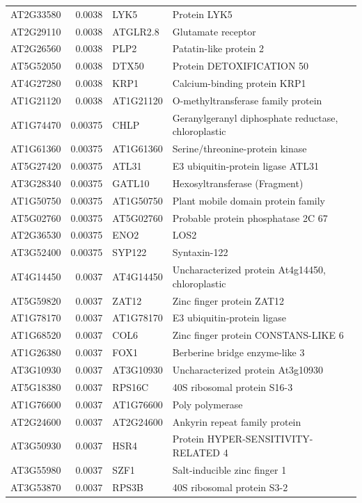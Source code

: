\documentclass[11pt]{article}
\begin{document}
\begin{center}
\begin{tabular}{lrll}
AT2G33580 & 0.0038 & LYK5 & Protein LYK5\\
AT2G29110 & 0.0038 & ATGLR2.8 & Glutamate receptor\\
AT2G26560 & 0.0038 & PLP2 & Patatin-like protein 2\\
AT5G52050 & 0.0038 & DTX50 & Protein DETOXIFICATION 50\\
AT4G27280 & 0.0038 & KRP1 & Calcium-binding protein KRP1\\
AT1G21120 & 0.0038 & AT1G21120 & O-methyltransferase family protein\\
AT1G74470 & 0.00375 & CHLP & Geranylgeranyl diphosphate reductase, chloroplastic\\
AT1G61360 & 0.00375 & AT1G61360 & Serine/threonine-protein kinase\\
AT5G27420 & 0.00375 & ATL31 & E3 ubiquitin-protein ligase ATL31\\
AT3G28340 & 0.00375 & GATL10 & Hexosyltransferase (Fragment)\\
AT1G50750 & 0.00375 & AT1G50750 & Plant mobile domain protein family\\
AT5G02760 & 0.00375 & AT5G02760 & Probable protein phosphatase 2C 67\\
AT2G36530 & 0.00375 & ENO2 & LOS2\\
AT3G52400 & 0.00375 & SYP122 & Syntaxin-122\\
AT4G14450 & 0.0037 & AT4G14450 & Uncharacterized protein At4g14450, chloroplastic\\
AT5G59820 & 0.0037 & ZAT12 & Zinc finger protein ZAT12\\
AT1G78170 & 0.0037 & AT1G78170 & E3 ubiquitin-protein ligase\\
AT1G68520 & 0.0037 & COL6 & Zinc finger protein CONSTANS-LIKE 6\\
AT1G26380 & 0.0037 & FOX1 & Berberine bridge enzyme-like 3\\
AT3G10930 & 0.0037 & AT3G10930 & Uncharacterized protein At3g10930\\
AT5G18380 & 0.0037 & RPS16C & 40S ribosomal protein S16-3\\
AT1G76600 & 0.0037 & AT1G76600 & Poly polymerase\\
AT2G24600 & 0.0037 & AT2G24600 & Ankyrin repeat family protein\\
AT3G50930 & 0.0037 & HSR4 & Protein HYPER-SENSITIVITY-RELATED 4\\
AT3G55980 & 0.0037 & SZF1 & Salt-inducible zinc finger 1\\
AT3G53870 & 0.0037 & RPS3B & 40S ribosomal protein S3-2\\

\end{tabular}
\end{center}
\end{document}
